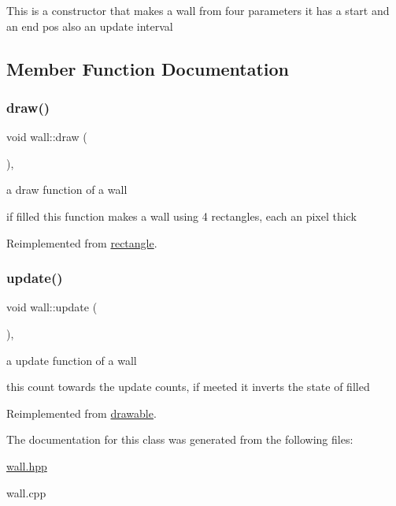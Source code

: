 This is a constructor that makes a wall from four parameters it has a start and an end pos also an update interval 

\subsection{Member Function Documentation}
\mbox{\label{classwall_abbae6802729e5a2e2a83a61694747b33}} 
\subsubsection{\texorpdfstring{draw()}{draw()}}
{\footnotesize\ttfamily void wall\+::draw (\begin{DoxyParamCaption}{ }\end{DoxyParamCaption})\hspace{0.3cm}{\ttfamily [override]}, {\ttfamily [virtual]}}



a draw function of a wall 

if filled this function makes a wall using 4 rectangles, each an pixel thick 

Reimplemented from \hyperlink{classrectangle}{rectangle}.

\mbox{\label{classwall_a84c4981162efc4f914e064c30ad52f03}} 
\subsubsection{\texorpdfstring{update()}{update()}}
{\footnotesize\ttfamily void wall\+::update (\begin{DoxyParamCaption}{ }\end{DoxyParamCaption})\hspace{0.3cm}{\ttfamily [override]}, {\ttfamily [virtual]}}



a update function of a wall 

this count towards the update counts, if meeted it inverts the state of filled 

Reimplemented from \hyperlink{classdrawable}{drawable}.



The documentation for this class was generated from the following files\+:\begin{DoxyCompactItemize}
\item 
\hyperlink{wall_8hpp}{wall.\+hpp}\item 
wall.\+cpp\end{DoxyCompactItemize}
